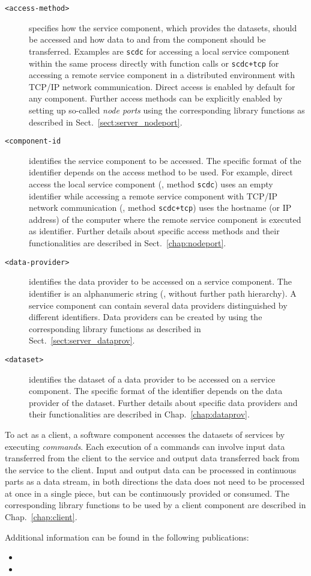 \begin{description}

  \item[\texttt{<access-method>}] specifies how the service component, which provides the datasets, should be accessed and how data to and from the component should be transferred.
Examples are \texttt{scdc} for accessing a local service component within the same process directly with function calls or \texttt{scdc+tcp} for accessing a remote service component in a distributed environment with TCP/IP network communication.
Direct access is enabled by default for any component.
Further access methods can be explicitly enabled by setting up so-called \textit{node ports} using the corresponding library functions as described in Sect.~\ref{sect:server_nodeport}.

  \item[\texttt{<component-id}] identifies the service component to be accessed.
The specific format of the identifier depends on the access method to be used.
For example, direct access the local service component (\ie, method \texttt{scdc}) uses an empty identifier while accessing a remote service component with TCP/IP network communication (\ie, method \texttt{scdc+tcp}) uses the hostname (or IP address) of the computer where the remote service component is executed as identifier.
Further details about specific access methods and their functionalities are described in Sect.~\ref{chap:nodeport}.

  \item[\texttt{<data-provider>}] identifies the data provider to be accessed on a service component.
The identifier is an alphanumeric string (\ie, without further path hierarchy).
A service component can contain several data providers distinguished by different identifiers.
Data providers can be created by using the corresponding library functions as described in Sect.~\ref{sect:server_dataprov}.

  \item[\texttt{<dataset>}] identifies the dataset of a data provider to be accessed on a service component.
The specific format of the identifier depends on the data provider of the dataset.
Further details about specific data providers and their functionalities are described in Chap.~\ref{chap:dataprov}.

\end{description}

To act as a client, a software component accesses the datasets of services by executing \textit{commands}.
Each execution of a commands can involve input data transferred from the client to the service and output data transferred back from the service to the client.
Input and output data can be processed in continuous parts as a data stream, \ie in both directions the data does not need to be processed at once in a single piece, but can be continuously provided or consumed.
The corresponding library functions to be used by a client component are described in Chap.~\ref{chap:client}.

Additional information can be found in the following publications:
\begin{itemize}
  \item {}
  \item {}
\end{itemize}
